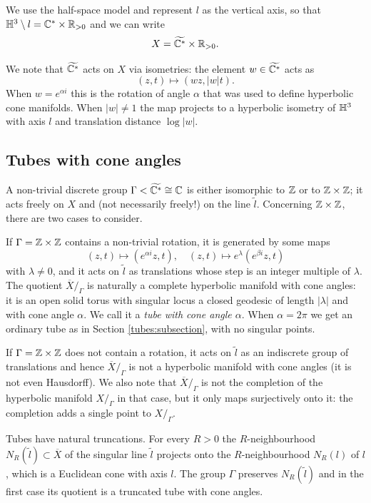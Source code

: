 We use the half-space model and represent $l$ as the vertical axis, so that $\mathbb{H}^3\setminus l = \mathbb{C}^* \times \mathbb{R}_{>0}$ and we can write
$$X = \widetilde{\mathbb{C}^*} \times \mathbb{R}_{>0}.$$ 

We note that $\widetilde{\mathbb{C}^*}$ acts on $X$ via isometries: the element $w\in\widetilde{\mathbb{C}^*}$ acts as
$$(z,t) \longmapsto (wz, |w| t).$$
When $w = e^{\alpha i}$ this is the rotation of angle $\alpha$ that was used to define hyperbolic cone manifolds. When $|w|\neq 1$ the map projects to a hyperbolic isometry of $\mathbb{H}^3$ with axis $l$ and translation distance $\log |w|$.

\subsection{Tubes with cone angles}  \label{X:quotients:subsection}
A non-trivial discrete group $\Gamma <\widetilde{\mathbb{C}^*}\cong \mathbb{C}$ is either isomorphic to $\mathbb{Z}$ or to $\mathbb{Z}\times \mathbb{Z}$; it acts freely on $X$ and (not necessarily freely!) on the line $\tilde l$. Concerning $\mathbb{Z}\times \mathbb{Z}$, there are two cases to consider.

If $\Gamma = \mathbb{Z}\times \mathbb{Z}$ contains a non-trivial rotation, it is generated by some maps
$$(z,t) \mapsto (e^{\alpha i}z, t), \quad (z,t) \mapsto e^\lambda(e^{\beta i}z, t)$$
with $\lambda\neq 0$, and it acts on $\tilde l$ as translations whose step is an integer multiple of $\lambda$. The quotient $\overline X/_{\Gamma}$ is naturally a complete hyperbolic manifold with cone angles: it is an open solid torus with singular locus a closed geodesic of length $|\lambda|$ and with cone angle $\alpha$. We call it a \emph{tube with cone angle $\alpha$}. When $\alpha = 2\pi$ we get an ordinary tube as in Section \ref{tubes:subsection}, with no singular points.

If $\Gamma = \mathbb{Z} \times \mathbb{Z}$ does not contain a rotation, it acts on $\tilde l$ as an indiscrete group of translations and hence $\overline X/_{\Gamma}$ is not a hyperbolic manifold with cone angles (it is not even Hausdorff). We also note that $\overline X/_{\Gamma}$ is not the completion of the hyperbolic manifold $X/_{\Gamma}$ in that case, but it only maps surjectively onto it: the completion adds a single point to $X/_{\Gamma}$.

Tubes have natural truncations. For every $R>0$ the $R$-neighbourhood $N_R(\tilde l)\subset \overline X$ of the singular line $\tilde l$ projects onto the $R$-neighbourhood $N_R(l)$ of $l$, which is a Euclidean cone with axis $l$. The group $\Gamma$ preserves $N_R(\tilde l)$ and in the first case its quotient is a truncated tube with cone angles.

